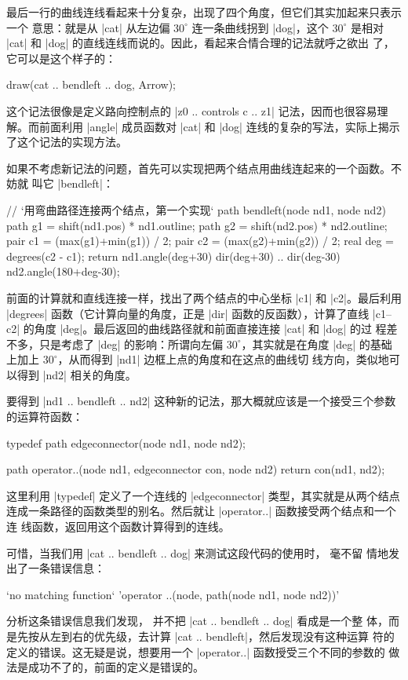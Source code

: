 最后一行的曲线连线看起来十分复杂，出现了四个角度，但它们其实加起来只表示一个
意思：就是从 |cat| 从左边偏 $30^\circ$ 连一条曲线拐到 |dog|，这个 $30^\circ$
是相对 |cat| 和 |dog| 的直线连线而说的。因此，看起来合情合理的记法就呼之欲出
了，它可以是这个样子的：
\begin{asycode}
draw(cat .. bendleft .. dog, Arrow);
\end{asycode}
这个记法很像是定义路向控制点的 |z0 .. controls c .. z1| 记法，因而也很容易理
解。而前面利用 |angle| 成员函数对 |cat| 和 |dog| 连线的复杂的写法，实际上揭示
了这个记法的实现方法。

如果不考虑新记法的问题，首先可以实现把两个结点用曲线连起来的一个函数。不妨就
叫它 |bendleft|：
\begin{asycode}
// `\color{comment}用弯曲路径连接两个结点，第一个实现`
path bendleft(node nd1, node nd2)
{
    path g1 = shift(nd1.pos) * nd1.outline;
    path g2 = shift(nd2.pos) * nd2.outline;
    pair c1 = (max(g1)+min(g1)) / 2;
    pair c2 = (max(g2)+min(g2)) / 2;
    real deg = degrees(c2 - c1);
    return nd1.angle(deg+30) {dir(deg+30)}
        .. {dir(deg-30)} nd2.angle(180+deg-30);
}
\end{asycode}
前面的计算就和直线连接一样，找出了两个结点的中心坐标 |c1| 和 |c2|。最后利用
|degrees| 函数（它计算向量的角度，正是 |dir| 函数的反函数），计算了直线
|c1--c2| 的角度 |deg|。最后返回的曲线路径就和前面直接连接 |cat| 和 |dog| 的过
程差不多，只是考虑了 |deg| 的影响：所谓向左偏 $30^\circ$，其实就是在角度
|deg| 的基础上加上 $30^\circ$，从而得到 |nd1| 边框上点的角度和在这点的曲线切
线方向，类似地可以得到 |nd2| 相关的角度。

要得到 |nd1 .. bendleft .. nd2| 这种新的记法，那大概就应该是一个接受三个参数
的运算符函数：
\begingroup
\renewcommand\thelstnumber{?}
\begin{asycode}[numbers=left]
typedef path edgeconnector(node nd1, node nd2);

path operator..(node nd1, edgeconnector con, node nd2)
{
    return con(nd1, nd2);
}
\end{asycode}
\endgroup
这里利用 |typedef| 定义了一个连线的 |edgeconnector| 类型，其实就是从两个结点
连成一条路径的函数类型的别名。然后就让 |operator..| 函数接受两个结点和一个连
线函数，返回用这个函数计算得到的连线。

可惜，当我们用 |cat .. bendleft .. dog| 来测试这段代码的使用时，\Asy{} 毫不留
情地发出了一条错误信息：
\begin{asycode}
`no matching function` 'operator ..(node, path(node nd1, node nd2))'
\end{asycode}
分析这条错误信息我们发现，\Asy{} 并不把 |cat .. bendleft .. dog| 看成是一个整
体，而是先按从左到右的优先级，去计算 |cat .. bendleft|，然后发现没有这种运算
符的定义的错误。这无疑是说，想要用一个 |operator..| 函数授受三个不同的参数的
做法是成功不了的，前面的定义是错误的。

